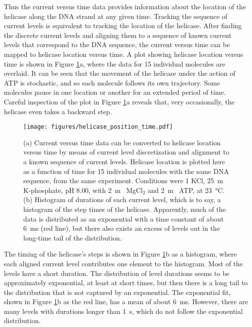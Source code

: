 Thus the current versus time data provides information about the location of the helicase along the DNA strand at any given time.  Tracking the sequence of current levels is equivalent to tracking the location of the helicase.  After finding the discrete current levels and aligning them to a sequence of known current levels that correspond to the DNA sequence, the current versus time can be mapped to helicase location versus time.  A plot showing helicase location versus time is shown in Figure \ref{fig:helicase_movement}a, where the data for \num{15} individual molecules are overlaid.  It can be seen that the movement of the helicase under the action of ATP is stochastic, and so each molecule follows its own trajectory.  Some molecules pause in one location or another for an extended period of time.  Careful inspection of the plot in Figure \ref{fig:helicase_movement}a reveals that, very occasionally, the helicase even takes a backward step.  

\begin{figure}[h]
\begin{centering}
\texttt{[image: figures/helicase\_position\_time.pdf]}
\caption[Current levels reveal helicase movement]{(a) Current versus time data can be converted to helicase location versus time by means of current level discretization and alignment to a known sequence of current levels.  Helicase location is plotted here as a function of time for \num{15} individual molecules with the same DNA sequence, from the same experiment.  Conditions were \SI{1}{\Molar} KCl, \SI{25}{\m\Molar} K-phosphate, pH \num{8.00}, with \SI{2}{\m\Molar} MgCl$_2$ and \SI{2}{\m\Molar} ATP, at \SI{23}{\celsius}.  (b) Histogram of durations of each current level, which is to say, a histogram of the step times of the helicase.  Apparently, much of the data is distributed as an exponential with a time constant of about \SI{6}{\ms} (red line), but there also exists an excess of levels out in the long-time tail of the distribution.}
\label{fig:helicase_movement}
\end{centering}
\end{figure}

The timing of the helicase's steps is shown in Figure \ref{fig:helicase_movement}b as a histogram, where each aligned current level contributes one element to the histogram.  Most of the levels have a short duration.  The distribution of level durations seems to be approximately exponential, at least at short times, but then there is a long tail to the distribution that is not captured by an exponential.  The exponential fit, shown in Figure \ref{fig:helicase_movement}b as the red line, has a mean of about \SI{6}{\ms}.  However, there are many levels with durations longer than \SI{1}{\s}, which do not follow the exponential distribution.

